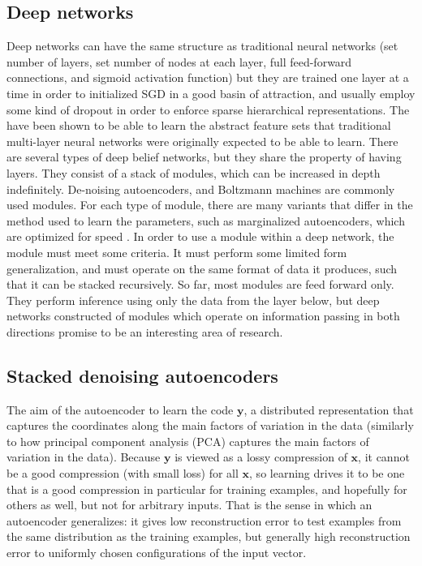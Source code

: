 \documentclass[12pt]{article}
\begin{document}
\begin{doublespacing}
	\subsection{Deep networks}
Deep networks can have the same structure as traditional neural networks (set number of layers, set number of nodes at each layer, full feed-forward connections, and sigmoid activation function) but they are trained one layer at a time in order to initialized SGD in a good basin of attraction, and usually employ some kind of dropout in order to enforce sparse hierarchical representations\cite{hinton2012improving, krizhevsky2012imagenet}. The have been shown to be able to learn the abstract feature sets that traditional multi-layer neural networks were originally expected to be able to learn. There are several types of deep belief networks, but they share the property of having layers. They consist of a stack of modules, which can be increased in depth indefinitely. De-noising autoencoders, and Boltzmann machines are commonly used modules. For each type of module, there are many variants that differ in the method used to learn the parameters, such as marginalized autoencoders, which are optimized for speed \cite{chen2012marginalized}. In order to use a module within a deep network, the module must meet some criteria. It must perform some limited form generalization, and must operate on the same format of data it produces, such that it can be stacked recursively. So far, most modules are feed forward only. They perform inference using only the data from the layer below, but deep networks constructed of modules which operate on information passing in both directions promise to be an interesting area of research.

	\subsection{Stacked denoising autoencoders}
The aim of the autoencoder to learn the code $\mathbf y$, a distributed representation that captures the coordinates along the main factors of variation in the data (similarly to how principal component analysis (PCA) captures the main factors of variation in the data). Because $\mathbf y$ is viewed as a lossy compression of $\mathbf x$, it cannot be a good compression (with small loss) for all $\mathbf x$, so learning drives it to be one that is a good compression in particular for training examples, and hopefully for others as well, but not for arbitrary inputs. That is the sense in which an autoencoder generalizes: it gives low reconstruction error to test examples from the same distribution as the training examples, but generally high reconstruction error to uniformly chosen configurations of the input vector.


\end{doublespacing}
\end{document}
